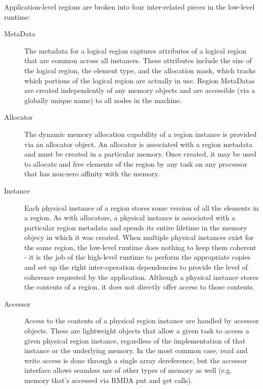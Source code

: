 Application-level regions are broken into four inter-related pieces in the
low-level runtime:
\begin{description}

\item[MetaData] The metadata for a logical region captures attributes of a
logical region that are common across all instances.  These attributes include
the size of the logical region, the element type, and the allocation mask,
which tracks which portions of the logical region are actually in use.  Region
MetaDatas are created independently of any memory objects and are accessible
(via a globally unique name) to all nodes in the machine.

\item[Allocator] The dynamic memory allocation capability of a region instance
is provided via an allocator object.  An allocator is associated with a
region metadata and must be created in a particular memory.  Once created, it
may be used to allocate and free elements of the region by any task on any
processor that has non-zero affinity with the memory.

\item[Instance] Each physical instance of a region stores some version of all
the elements in a region.  As with allocators, a physical instance is
associated with a particular region metadata and spends its entire lifetime in
the memory objecy in which it was created.  When multiple physical instances
exist for the same region, the low-level runtime does nothing to keep them
coherent - it is the job of the high-level runtime to perform the appropriate
copies and set up the right inter-operation dependencies to provide the level
of coherence requested by the application.  Although a physical instance 
stores the contents of a region, it does not directly offer access to those
contents.

\item[Accessor] Access to the contents of a physical region instance are 
handled by accessor objects.  These are lightweight objects that allow a given
task to access a given physical region instance, regardless of the
implementation of that instance or the underlying memory.  In the most common
case, read and write access is done through a single array dereference, but the
accessor interface allows seamless use of other types of memory as well (e.g.
memory that's accessed via RMDA put and get calls).

\end{description}

